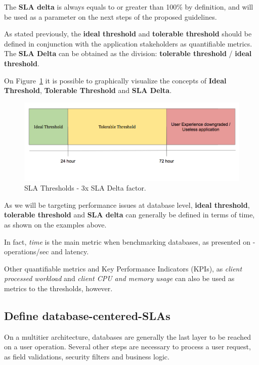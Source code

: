 The \textbf{SLA delta} is always equals to or greater than 100\% by definition, and will be used as a parameter on the next steps of the proposed guidelines.

As stated previously, the \textbf{ideal threshold} and \textbf{tolerable threshold} should be defined in conjunction with the application stakeholders as quantifiable metrics. The \textbf{SLA Delta} can be obtained as the division: \textbf{tolerable threshold} / \textbf{ideal threshold}.

On Figure~\ref{fig:thresholds} it is possible to graphically visualize the concepts of \textbf{Ideal Threshold}, \textbf{Tolerable Threshold} and \textbf{SLA Delta}.

\begin{figure}[ht!]
\centering
\includegraphics[width=120mm]{Imagens/thresholds.png}
\caption{SLA Thresholds - 3x SLA Delta factor. \label{fig:thresholds}}
\end{figure}

As we will be targeting performance issues at database level, \textbf{ideal threshold}, \textbf{tolerable threshold} and \textbf{SLA delta} can generally be defined in terms of time, as shown on the examples above. 

In fact, \textit{time} is the main metric when benchmarking databases, as presented on \cite{datastaxbenchmark} - operations/sec and latency. 

Other quantifiable metrics and Key Performance Indicators (KPIs), as \textit{ client processed workload} and \textit{client CPU and memory usage} can also be used as metrics to the thresholds, however. 


\subsection{Define database-centered-SLAs}

On a multitier architecture, databases are generally the last layer to be reached on a user operation. Several other steps are necessary to process a user request, as field validations, security filters and business logic.

